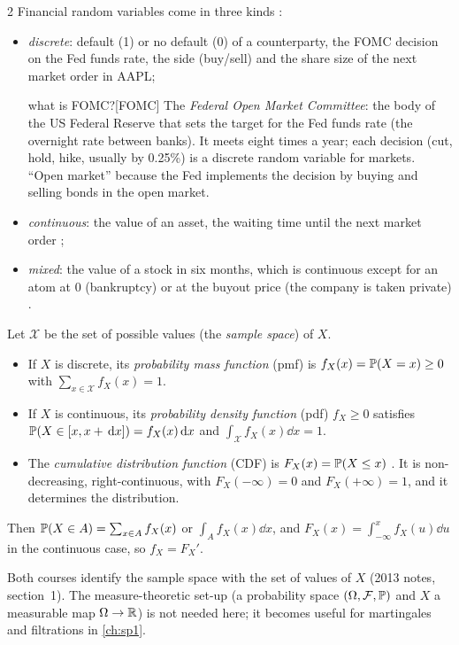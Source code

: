 \begin{paracol}{2}
Financial random variables come in three kinds :
\begin{itemize}
  \item \emph{discrete}: default (1) or no default (0) of a counterparty, the FOMC decision on the Fed
        funds rate, the side (buy/sell) and the share size of the next market order in AAPL;\begin{answer}{what is FOMC?}[FOMC]
The \emph{Federal Open Market Committee}: the body of the US Federal Reserve that sets the target for the
Fed funds rate (the overnight rate between banks). It meets eight times a year; each decision (cut, hold,
hike, usually by 0.25\%) is a discrete random variable for markets. ``Open market'' because the Fed
implements the decision by buying and selling bonds in the open market.
\end{answer}
  \item \emph{continuous}: the value of an asset, the waiting time until the next market order
        ;
  \item \emph{mixed}: the value of a stock in six months, which is continuous except for an atom at
        $0$ (bankruptcy) or at the buyout price (the company is taken private) .
\end{itemize}

\begin{definition}
Let $\mathcal X$ be the set of possible values (the \emph{sample space}) of $X$.
\begin{itemize}
  \item If $X$ is discrete, its \emph{probability mass function} (pmf) is $f_X(x)=\mathbb{P}(X=x)\ge0$ with
        $\sum_{x\in\mathcal X}f_X(x)=1$.
  \item If $X$ is continuous, its \emph{probability density function} (pdf) $f_X\ge0$ satisfies
        $\mathbb{P}(X\in[x,x+\,\mathrm{d} x])=f_X(x)\,\mathrm{d} x$ and $\int_{\mathcal X}f_X(x)\dd x=1$.
  \item The \emph{cumulative distribution function} (CDF) is $F_X(x)=\mathbb{P}(X\le x)$
        . It is non-decreasing, right-continuous, with $F_X(-\infty)=0$ and
        $F_X(+\infty)=1$, and it determines the distribution.
\end{itemize}
Then $\mathbb{P}(X\in A)=\sum_{x\in A}f_X(x)$ or $\int_Af_X(x)\dd x$, and $F_X(x)=\int_{-\infty}^xf_X(u)\dd u$ in
the continuous case, so $f_X=F_X'$.
\end{definition}

\begin{remark}
Both courses identify the sample space with the set of values of $X$ (2013 notes, section~1). The
measure-theoretic set-up (a probability space $(\Omega,\mathcal F,\mathbb{P})$ and $X$ a measurable map
$\Omega\to\mathbb{R}$) is not needed here; it becomes useful for martingales and filtrations in \cref{ch:sp1}.
\end{remark}


\end{paracol}
